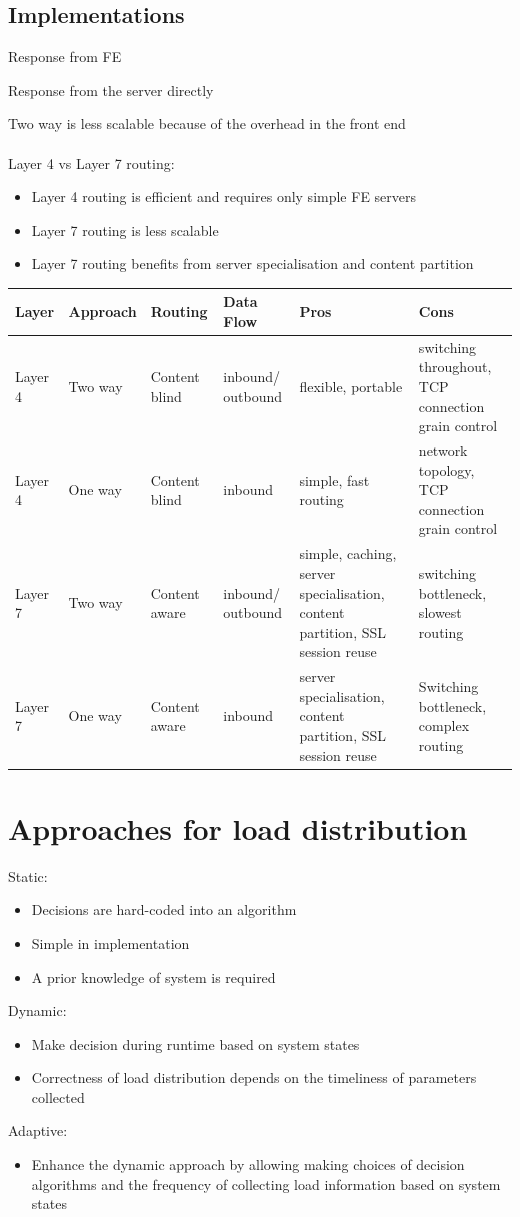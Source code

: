 \documentclass{article}[18pt]
\begin{document}
\subsection{Implementations}
\begin{definition}
Response from FE
\end{definition}
\begin{definition}
Response from the server directly
\end{definition}
Two way is less scalable because of the overhead in the front end\\
\\
Layer 4 vs Layer 7 routing:
\begin{itemize}
	\item Layer 4 routing is efficient and requires only simple FE servers
	\item Layer 7 routing is less scalable
	\item Layer 7 routing benefits from server specialisation and content partition
\end{itemize}
\begin{tabularx}{\textwidth}{|X|X|X|X|X|X|}
	\hline
	Layer & Approach & Routing & Data Flow & Pros & Cons \\
	\hline
	Layer 4 & Two way & Content blind & inbound/ outbound & flexible, portable & switching throughout, TCP connection grain control \\
	\hline
	Layer 4 & One way & Content blind & inbound & simple, fast routing & network topology, TCP connection grain control \\
	\hline
	Layer 7 & Two way & Content aware & inbound/ outbound & simple, caching, server specialisation, content partition, SSL session reuse & switching bottleneck, slowest routing \\
	\hline
	Layer 7 & One way & Content aware & inbound & server specialisation, content partition, SSL session reuse & Switching bottleneck, complex routing \\
	\hline
\end{tabularx}
\section{Approaches for load distribution}
Static:
\begin{itemize}
	\item Decisions are hard-coded into an algorithm
	\item Simple in implementation
	\item A prior knowledge of system is required
\end{itemize}
Dynamic:
\begin{itemize}
	\item Make decision during runtime based on system states
	\item Correctness of load distribution depends on the timeliness of parameters collected
\end{itemize}
Adaptive:
\begin{itemize}
	\item Enhance the dynamic approach by allowing making choices of decision algorithms and the frequency of collecting load information based on system states
\end{itemize}
\end{document}

